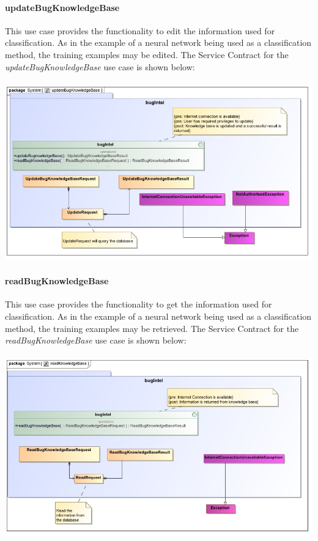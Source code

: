 \documentclass[11pt,a4paper,titlepage]{article}
\begin{document}
		\paragraph{updateBugKnowledgeBase }		
		This use case provides the functionality to edit the information used for classification. As in the example of a neural network being used as a classification method, the training examples may be edited.		
		The Service Contract for the \textit{updateBugKnowledgeBase} use case is shown below:\\\hfill\\
		\includegraphics[width=\linewidth]{updateBugKnowledgeBase}
		
		\paragraph{readBugKnowledgeBase }
				This use case provides the functionality to get the information used for classification. As in the example of a neural network being used as a classification method, the training examples may be retrieved.	
		The Service Contract for the \textit{readBugKnowledgeBase} use case is shown below:\\\hfill\\
		\includegraphics[width=\linewidth]{readKnowledgeBase}
		
\end{document}
